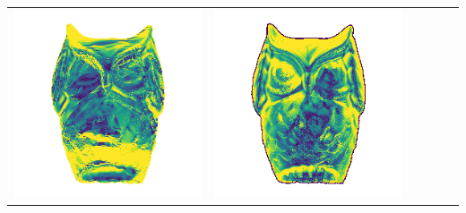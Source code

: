 \begin{tabularx}{\linewidth}{@{}Y@{}Y@{}Y@{}Y@{}Y@{}Y@{}}
\includegraphics[width=\linewidth]{semisynthetic/20160617_15_yu_err.png} &
\includegraphics[width=\linewidth]{semisynthetic/20160617_15_dpsn_err.png} &

\end{tabularx}
